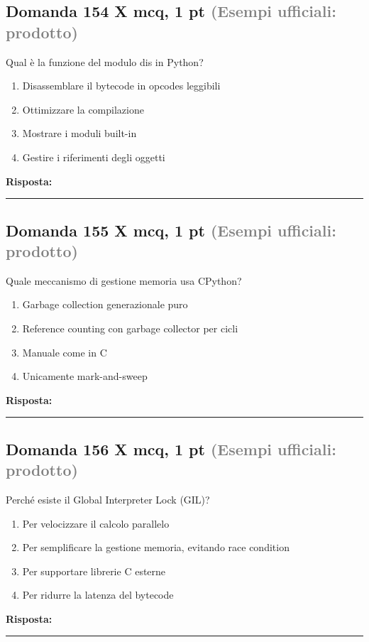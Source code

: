 \documentclass[a4paper,11pt]{article}
\begin{document}
\subsection*{Domanda 154 X \hfill {\small mcq, 1 pt \textcolor{gray}{(Esempi ufficiali: prodotto)}}}
Qual è la funzione del modulo dis in Python?

\begin{enumerate}[label=\alph*)]
\item Disassemblare il bytecode in opcodes leggibili
\item Ottimizzare la compilazione
\item Mostrare i moduli built-in
\item Gestire i riferimenti degli oggetti
\end{enumerate}
\vspace{0.2cm}
\noindent\textbf{Risposta:}\par
\vspace{1.5cm}\hrule


\subsection*{Domanda 155 X \hfill {\small mcq, 1 pt \textcolor{gray}{(Esempi ufficiali: prodotto)}}}
Quale meccanismo di gestione memoria usa CPython?

\begin{enumerate}[label=\alph*)]
\item Garbage collection generazionale puro
\item Reference counting con garbage collector per cicli
\item Manuale come in C
\item Unicamente mark-and-sweep
\end{enumerate}
\vspace{0.2cm}
\noindent\textbf{Risposta:}\par
\vspace{1.5cm}\hrule


\subsection*{Domanda 156 X \hfill {\small mcq, 1 pt \textcolor{gray}{(Esempi ufficiali: prodotto)}}}
Perché esiste il Global Interpreter Lock (GIL)?

\begin{enumerate}[label=\alph*)]
\item Per velocizzare il calcolo parallelo
\item Per semplificare la gestione memoria, evitando race condition
\item Per supportare librerie C esterne
\item Per ridurre la latenza del bytecode
\end{enumerate}
\vspace{0.2cm}
\noindent\textbf{Risposta:}\par
\vspace{1.5cm}\hrule
\end{document}
